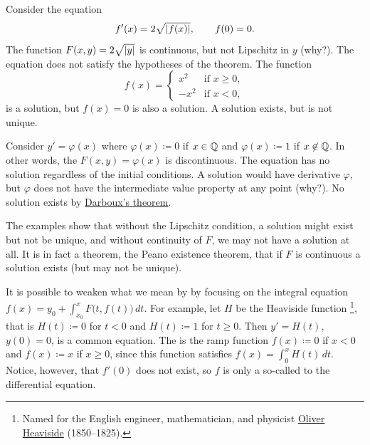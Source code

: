 \begin{example}
Consider the equation
\begin{equation*}
f'(x) = 2 \sqrt{\left\lvert {f(x)} \right\rvert}, \qquad f(0) = 0 .
\end{equation*}
The function $F(x,y) = 2 \sqrt{\left\lvert {y} \right\rvert}$ is continuous,
but not Lipschitz in $y$ (why?). 
The equation does not satisfy the hypotheses of the theorem.
The function
\begin{equation*}
f(x) =
\begin{cases}
x^2 & \text{if } x \geq 0,\\
-x^2 & \text{if } x < 0,
\end{cases}
\end{equation*}
is a solution, but $f(x) = 0$ is also a solution.
A solution exists, but is not unique.
\end{example}

\begin{example}
Consider $y' = \varphi(x)$ where $\varphi(x) \coloneqq 0$ if $x \in {\mathbb{Q}}$ and
$\varphi(x)\coloneqq 1$ if $x
\not\in {\mathbb{Q}}$.  In other words, the $F(x,y) = \varphi(x)$ is discontinuous.
The equation has no solution regardless of the initial
conditions.
A solution would have
derivative $\varphi$, but $\varphi$ does not have the intermediate value property
at any point (why?).  No solution exists by
\hyperref[thm:darboux]{Darboux's theorem}.
\end{example}

The examples show that without the Lipschitz condition, a solution might
exist but not be unique, and without continuity of $F$, we may not
have a solution at all.
It is in fact a theorem, the Peano existence theorem, that if $F$ is
continuous a solution exists (but may not be unique).

\begin{remark}
It is possible to weaken what we mean by 
by focusing on the integral equation
$f(x) = y_0 + \int_{x_0}^x F\bigl(t,f(t)\bigr) \, dt$.  For example,
let $H$ be the
Heaviside function%
\footnote{Named
for the English engineer, mathematician, and physicist
\href{https://en.wikipedia.org/wiki/Oliver_Heaviside}{Oliver Heaviside}
(1850--1825).},
that is $H(t) \coloneqq 0$ for $t < 0$ and $H(t) \coloneqq 1$ for $t \geq 0$.
Then
$y' = H(t)$, $y(0) = 0$,
is a common equation.
The 
is the ramp function $f(x) \coloneqq 0$ if $x < 0$ and $f(x) \coloneqq x$ if $x \geq 0$,
since this function satisfies
$f(x) = \int_0^x H(t)\, dt$.  Notice, however, that $f'(0)$ does not exist,
so $f$ is only a so-called \emph{} to the
differential equation.
\end{remark}


